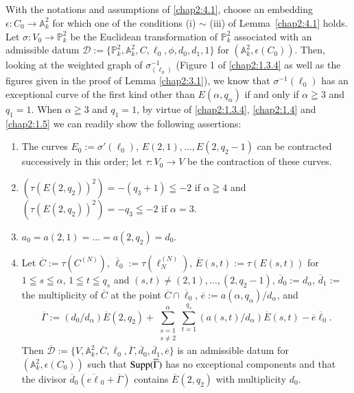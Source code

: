 \subsection{}\label{chap2:4.2}
With the notations and assumptions of \ref{chap2:4.1}, choose an embedding
$\epsilon:C_{0}\to \mathbb{A}^{2}_{k}$ for which one of the conditions
(i) $\sim$ (iii) of Lemma\pageoriginale\ \ref{chap2:4.1} holds. Let
$\sigma:V_{0}\to \mathbb{P}^{2}_{k}$ be the Euclidean transformation
of $\mathbb{P}^{2}_{k}$ associated with an admissible datum
$\mathscr{D}:=\{\mathbb{P}^{2}_{k},\mathbb{A}^{2}_{k},C,\ell_{0},\phi,d_{0},d_{1},1\}$
for $(\mathbb{A}^{2}_{k},\epsilon(C_{0}))$. Then, looking at the
weighted graph of $\sigma^{-1}_{(\ell_{0})}$ (\cf Figure 1 of
\ref{chap2:1.3.4} as well as the figures given in the proof of Lemma
\ref{chap2:3.1}), we know that $\sigma^{-1}(\ell_{0})$ has an
exceptional curve of the first kind other than $E(\alpha,q_{\alpha})$
if and only if $\alpha\geqq 3$ and $q_{1}=1$. When $\alpha\geqq 3$ and
$q_{1}=1$, by virtue of \ref{chap2:1.3.4}, \ref{chap2:1.4} and \ref{chap2:1.5} we can
readily show the following assertions:
\begin{enumerate}
\renewcommand{\labelenumi}{\theenumi$^{\circ}$}
\item The curves $E_{0}:=\sigma'(\ell_{0})$,
  $E(2,1),\ldots, E(2,q_{2}-1)$ can be contracted successively in this
  order; let $\tau:V_{0}\to V$ be the contraction of these curves.

\item $(\tau(E(2,q_{2}))^{2})=-(q_{3}+1)\leqq -2$ if $\alpha\geqq 4$
  and $(\tau(E(2,q_{2}))^{2})=-q_{3}\leqq -2$ if $\alpha=3$.

\item $a_{0}=a(2,1)=\ldots=a(2,q_{2})=d_{0}$.

\item Let $\overline{C}:=\tau(C^{(N)})$,
  $\overline{\ell}_{0}:=\tau(\ell^{(N)}_{N})$,
  $\overline{E}(s,t):=\tau(E(s,t))$ for $1\leqq s\leqq \alpha$,
  $1\leqq t\leqq q_{s}$ and $(s,t)\neq (2,1),\ldots,(2,q_{2}-1)$,
  $\overline{d}_{0}:=d_{\alpha}$, $\overline{d}_{1}:=$ the
  multiplicity of $\overline{C}$ at the point $\overline{C}\cap
  \overline{\ell}_{0}$,
  $\overline{e}:=a(\alpha,q_{\alpha})/d_{\alpha}$, and
$$
\overline{\Gamma}:=(d_{0}/d_{\alpha})\overline{E}(2,q_{2})+\sum^{\alpha}_{\substack{s=1\\ s\neq
2}}\sum^{q_{s}}_{t=1}(a(s,t)/d_{\alpha})\overline{E}(s,t)-\overline{e}\overline{\ell}_{0}.
$$
Then
$\overline{\mathscr{D}}:=\{V,\mathbb{A}^{2}_{k},\overline{C},\overline{\ell}_{0},\overline{\Gamma},\overline{d}_{0},\overline{d}_{1},\overline{e}\}$
is an admissible datum for $(\mathbb{A}^{2}_{k},\epsilon(C_{0}))$ such
that $\operatorname{Supp}(\overline{\Gamma})$ has no exceptional components and that
the divisor $\overline{d}_{0}(\overline{e\ell}_{0}+\overline{\Gamma})$
contains $\overline{E}(2,q_{2})$ with multiplicity $d_{0}$. 
\end{enumerate}

